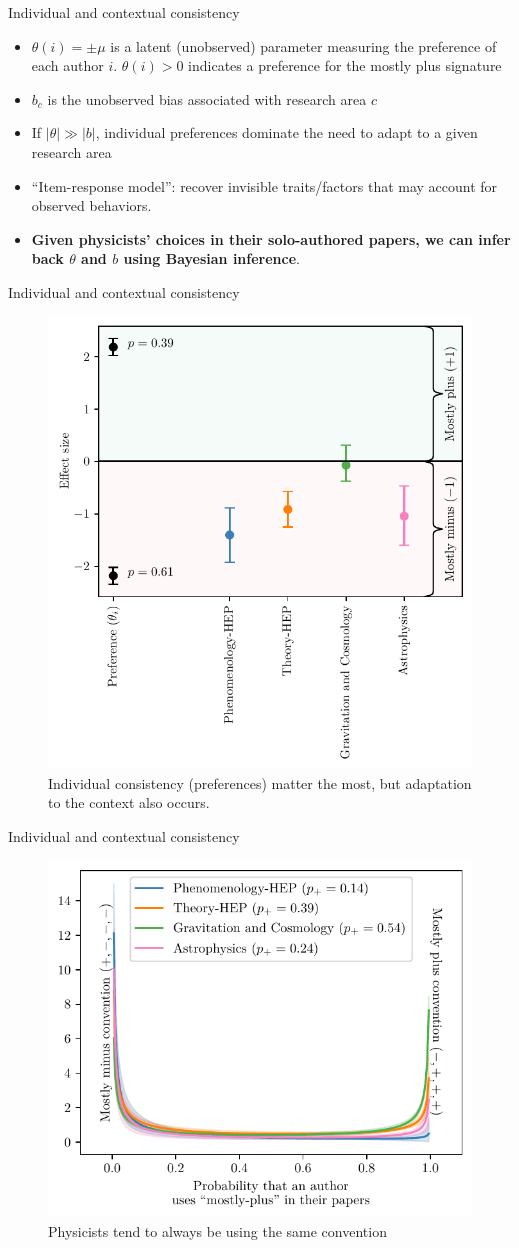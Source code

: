 \documentclass[10pt]{beamer}
\begin{document}
\begin{frame}{Individual and contextual consistency}
\begin{itemize}
    \item<2-> $\theta(i)=\pm \mu$ is a latent (unobserved) parameter measuring the preference of each author $i$. $\theta(i)>0$ indicates a preference for the mostly plus signature
    \item<3-> $b_c$ is the unobserved bias associated with research area $c$
    \item<4-> If $|\theta|\gg |b|$, individual preferences dominate the need to adapt to a given research area
    \item<5-> ``Item-response model'': recover invisible traits/factors that may account for observed behaviors.
    \item<6-> \textbf{Given physicists' choices in their solo-authored papers, we can infer back $\theta$ and $b$ using Bayesian inference}.
\end{itemize}
\end{frame}

\begin{frame}{Individual and contextual consistency}
\vspace{-1em}
\begin{figure}
\centering
\includegraphics[width=0.5\linewidth]{consistency_vs_task_simple.pdf}
    \vspace{-0.75em}
    \caption{Individual consistency (preferences) matter the most, but adaptation to the context also occurs.}
\end{figure}
\end{frame}

\begin{frame}{Individual and contextual consistency}
\begin{figure}
\centering
\includegraphics[width=0.5\linewidth]{preferences.pdf}
    \caption{Physicists tend to always be using the same convention}
\end{figure}
\end{frame}
\end{document}
